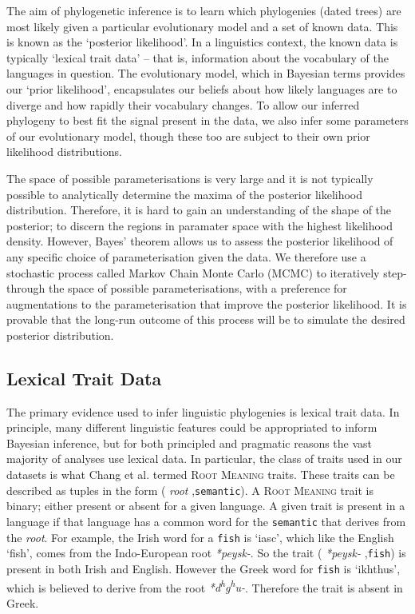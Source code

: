 \documentclass[10pt,journal,compsoc]{IEEEtran}
\newcommand{\ts}{\textsuperscript}
\begin{document}
The aim of phylogenetic inference is to learn which phylogenies (dated trees) are most likely given a particular evolutionary model and a set of known data. This is known as the `posterior likelihood'. In a linguistics context, the known data is typically `lexical trait data' -- that is, information about the vocabulary of the languages in question. The evolutionary model, which in Bayesian terms provides our `prior likelihood', encapsulates our beliefs about how likely languages are to diverge and how rapidly their vocabulary changes. To allow our inferred phylogeny to best fit the signal present in the data, we also infer some parameters of our evolutionary model, though these too are subject to their own prior likelihood distributions.

The space of possible parameterisations is very large and it is not typically possible to analytically determine the maxima of the posterior likelihood distribution. Therefore, it is hard to gain an understanding of the shape of the posterior; to discern the regions in paramater space with the highest likelihood density. However, Bayes' theorem allows us to assess the posterior likelihood of any specific choice of parameterisation given the data. We therefore use a stochastic process called Markov Chain Monte Carlo (MCMC) to iteratively step-through the space of possible parameterisations, with a preference for augmentations to the parameterisation that improve the posterior likelihood. It is provable that the long-run outcome of this process will be to  simulate the desired posterior distribution.

\subsection{Lexical Trait Data}

The primary evidence used to infer linguistic phylogenies is lexical trait data. In principle, many different linguistic features could be appropriated to inform Bayesian inference, but for both principled and pragmatic reasons the vast majority of analyses use lexical data. In particular, the class of traits used in our datasets is what Chang et al. termed \textsc{Root Meaning} traits. These traits can be described as tuples in the form (\textit{ root },\;\texttt{semantic}\;). A \textsc{Root Meaning} trait is binary; either present or absent for a given language. A given trait is present in a language if that language has a common word for the \texttt{semantic} that derives from the \textit{root}. For example, the Irish word for a \texttt{fish} is `iasc', which like the English `fish', comes from the Indo-European root \textit{*peysk-}. So the trait (\textit{ *peysk- },\;\texttt{fish}\;) is present in both Irish and English. However the Greek word for \texttt{fish} is `ikhthus', which is believed to derive from the root \textit{*d\ts{h}g\ts{h}u-}. Therefore the trait is absent in Greek.
\end{document}
